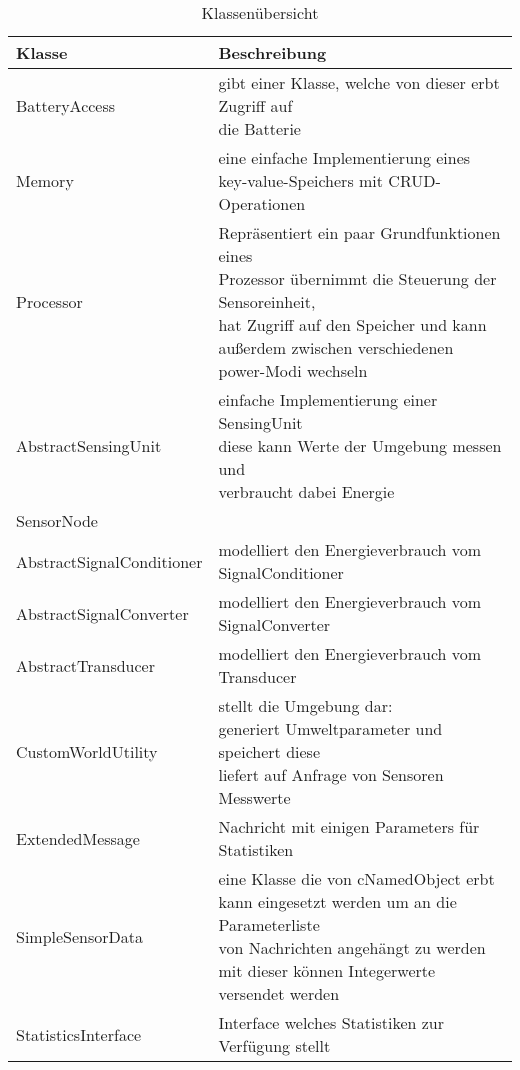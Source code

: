 \begin{table}[!ht]
  \centering
  \caption{Klassenübersicht}
  \label{Klassenübersicht}
\begin{tabularx}{\textwidth}{ll}
	\toprule
	Klasse & Beschreibung \\
	\midrule\midrule
	BatteryAccess &	\specialcell{gibt einer Klasse, welche von dieser erbt Zugriff auf \\die Batterie} \\\midrule
Memory & \specialcell{eine einfache Implementierung eines \\key-value-Speichers mit CRUD-Operationen}\\\midrule
Processor	& \specialcell{Repräsentiert ein paar Grundfunktionen eines \\ Prozessor übernimmt die Steuerung der Sensoreinheit, \\ hat Zugriff auf den Speicher und  kann \\außerdem zwischen verschiedenen power-Modi wechseln }\\\midrule
AbstractSensingUnit & \specialcell{einfache Implementierung einer SensingUnit \\ diese kann Werte der Umgebung messen und \\verbraucht dabei Energie}\\\midrule
SensorNode	& \specialcell{ist hauptsächlich für die Initialisierung zuständig}\\\midrule
AbstractSignalConditioner	& modelliert den Energieverbrauch vom SignalConditioner \\\midrule
AbstractSignalConverter	& modelliert den Energieverbrauch vom SignalConverter\\\midrule
AbstractTransducer	& modelliert den Energieverbrauch vom Transducer\\\midrule
CustomWorldUtility	& \specialcell{stellt die Umgebung dar:\\ generiert Umweltparameter und speichert diese\\ liefert auf Anfrage von Sensoren Messwerte}\\\midrule
ExtendedMessage & Nachricht mit einigen Parameters für Statistiken\\\midrule
SimpleSensorData	& \specialcell{eine Klasse die von cNamedObject erbt\\ kann eingesetzt werden um an die Parameterliste \\von Nachrichten angehängt zu werden\\mit dieser können Integerwerte versendet werden}\\\midrule
StatisticsInterface & Interface welches Statistiken zur Verfügung stellt\\
	\bottomrule
\end{tabularx}
\end{table}

